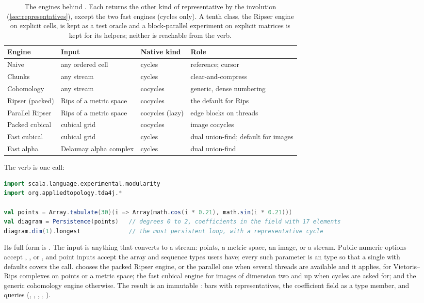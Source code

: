 \begin{table}[t]
\centering\small
\begin{tabular}{@{}p{3.9cm} p{3.4cm} p{3.2cm} p{3.8cm}@{}}
\toprule
Engine & Input & Native kind & Role \\
\midrule
Naive & any ordered cell & cycles & reference; cursor \\
Chunks & any stream & cycles & clear-and-compress~\cite{bkr2014chunks} \\
Cohomology & any stream & cocycles & generic, dense numbering \\
Ripser (packed) & Rips of a metric space & cocycles & the default for Rips \\
Parallel Ripser & Rips of a metric space & cocycles (lazy) & edge blocks on threads \\
Packed cubical & cubical grid & cocycles & image cocycles \\
Fast cubical & cubical grid & cycles & dual union-find; default for images \\
Fast alpha & Delaunay alpha complex & cycles & dual union-find \\
\bottomrule
\end{tabular}
\caption{The engines behind . Each returns the other kind of representative by the involution
(\cref{sec:representatives}), except the two fast engines (cycles only). A tenth class, the Ripser engine on explicit
 cells, is kept as a test oracle and a block-parallel experiment on explicit matrices is kept for its
helpers; neither is reachable from the verb.}
\label{tab:engines}
\end{table}

The verb is one call:
\begin{lstlisting}[language=Scala]
import scala.language.experimental.modularity
import org.appliedtopology.tda4j.*

val points = Array.tabulate(30)(i => Array(math.cos(i * 0.21), math.sin(i * 0.21)))
val diagram = Persistence(points)   // degrees 0 to 2, coefficients in the field with 17 elements
diagram.dim(1).longest              // the most persistent loop, with a representative cycle
\end{lstlisting}
Its full form is . The input is anything that converts to a stream: points, a metric space, an image, or a stream. Public numeric
options accept , ,  or , and point inputs accept the array and sequence types
users have; every such parameter is an  type so that a single  with defaults covers the call.
 chooses the packed Ripser engine, or the parallel one when several threads are available and it applies,
for Vietoris--Rips complexes on points or a metric space; the fast cubical engine for images of dimension two and up when
cycles are asked for; and the generic cohomology engine otherwise.
The result is an immutable : bars with representatives, the coefficient field as a type member,
and queries (, , , , ).

